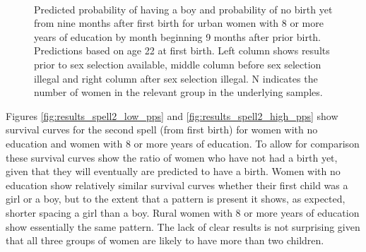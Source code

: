 \documentclass[12pt,letterpaper]{article}
\begin{document}
\begin{figure}[htpb]
{\begin{minipage}{0.31\textwidth}
        \captionsetup[subfigure]{labelformat=empty,position=top,captionskip=-1pt,farskip=-0.5pt}
        \\
        \captionsetup[subfigure]{labelformat=parens}
    \end{minipage}
}
\setcounter{subfigure}{3}
\caption{Predicted probability of having a boy and probability of
no birth yet from nine months after first birth for urban 
women with 8 or more years of education by month beginning 9 months after prior birth. 
Predictions based on age 22 at first birth.
Left column shows results prior to sex selection available, middle column before
sex selection illegal and right column after sex selection illegal.
N indicates the number of women in the relevant group in the underlying samples.
}
\label{fig:results_spell2_high_urban}
\end{figure}





Figures \ref{fig:results_spell2_low_pps} and \ref{fig:results_spell2_high_pps}
show survival curves for the second spell (from first birth) for women with
no education and women with 8 or more years of education.
To allow for comparison these survival curves show the ratio of women who
have not had a birth yet, given that they will eventually are predicted to
have a birth.
Women with no education show relatively similar survival curves whether their
first child was a girl or a boy, but to the extent that a pattern is present
it shows, as expected, shorter spacing a girl than a boy.
Rural women with 8 or more years of education show essentially the same 
pattern.
The lack of clear results is not surprising given that all three groups of
women are likely to have more than two children.
\end{document}
